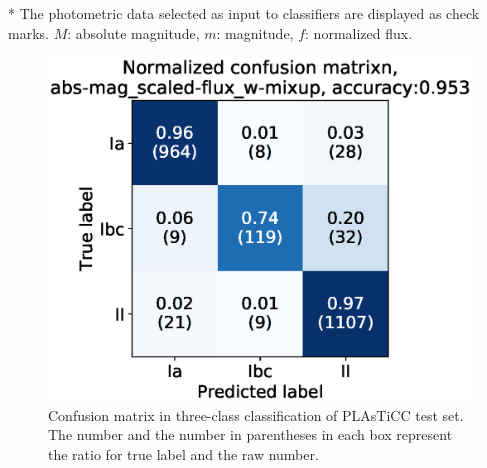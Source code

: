 \documentclass[useamsfonts]{pasj01}
\begin{document}
\begin{table}[ht]
\label{tab:p_test}
\begin{tabnote}
* The photometric data selected as input to classifiers are displayed as check marks.
$M$: absolute magnitude, $m$: magnitude, $f$: normalized flux.
\end{tabnote}
\end{table}
%
\begin{figure}[ht]
  \begin{center}
     \includegraphics[width=\columnwidth]{figures/06_CM_abs-mag_scaled-flux_w-mixup_predictions_test_2.eps}
  \end{center}
  \caption{%
  Confusion matrix in three-class classification of PLAsTiCC test set.
  The number and the number in parentheses in each box represent the ratio for true label and the raw number.
  }%
  \label{fig:plasticc_3class_CM}
\end{figure}
%
\end{document}
